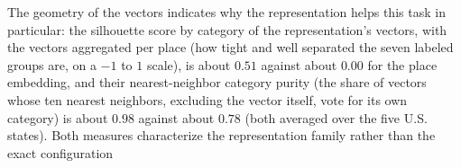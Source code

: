 The geometry of the vectors indicates why the representation helps this task in
particular: the silhouette score by category of the representation's vectors, with the vectors aggregated per place (how tight and well separated the seven labeled groups are, on a $-1$ to $1$ scale), is about $0.51$ against about $0.00$ for the place embedding, and their nearest-neighbor category purity (the share of vectors whose ten nearest neighbors, excluding the vector itself, vote for its own category) is about $0.98$ against about $0.78$ (both averaged over the five U.S. states). Both measures characterize the representation family rather than the exact configuration
